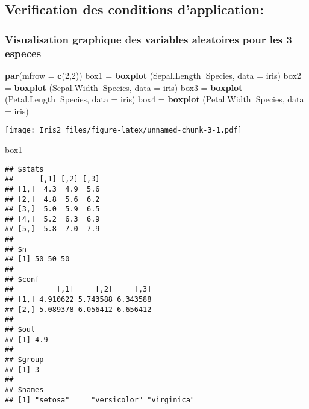 \documentclass[]{article}
\newenvironment{Shaded}{\begin{snugshade}}{\end{snugshade}}
\newcommand{\KeywordTok}[1]{\textcolor[rgb]{0.13,0.29,0.53}{\textbf{#1}}}
\newcommand{\DataTypeTok}[1]{\textcolor[rgb]{0.13,0.29,0.53}{#1}}
\newcommand{\DecValTok}[1]{\textcolor[rgb]{0.00,0.00,0.81}{#1}}
\newcommand{\StringTok}[1]{\textcolor[rgb]{0.31,0.60,0.02}{#1}}
\newcommand{\OperatorTok}[1]{\textcolor[rgb]{0.81,0.36,0.00}{\textbf{#1}}}
\newcommand{\NormalTok}[1]{#1}
\begin{document}
\subsection{Verification des conditions
d'application:}\label{verification-des-conditions-dapplication}

\subsubsection{Visualisation graphique des variables aleatoires pour les
3
especes}\label{visualisation-graphique-des-variables-aleatoires-pour-les-3-especes}

\begin{Shaded}
\begin{Highlighting}[]
\KeywordTok{par}\NormalTok{(}\DataTypeTok{mfrow =} \KeywordTok{c}\NormalTok{(}\DecValTok{2}\NormalTok{,}\DecValTok{2}\NormalTok{))}
\NormalTok{box1 =}\StringTok{ }\KeywordTok{boxplot}\NormalTok{ (Sepal.Length}\OperatorTok{~}\NormalTok{Species, }\DataTypeTok{data =}\NormalTok{ iris)}
\NormalTok{box2 =}\StringTok{ }\KeywordTok{boxplot}\NormalTok{ (Sepal.Width}\OperatorTok{~}\NormalTok{Species, }\DataTypeTok{data =}\NormalTok{ iris)}
\NormalTok{box3 =}\StringTok{ }\KeywordTok{boxplot}\NormalTok{ (Petal.Length}\OperatorTok{~}\NormalTok{Species, }\DataTypeTok{data =}\NormalTok{ iris)}
\NormalTok{box4 =}\StringTok{ }\KeywordTok{boxplot}\NormalTok{ (Petal.Width}\OperatorTok{~}\NormalTok{Species, }\DataTypeTok{data =}\NormalTok{ iris)}
\end{Highlighting}
\end{Shaded}

\texttt{[image: Iris2\_files/figure-latex/unnamed-chunk-3-1.pdf]}

\begin{Shaded}
\begin{Highlighting}[]
\NormalTok{box1}
\end{Highlighting}
\end{Shaded}

\begin{verbatim}
## $stats
##      [,1] [,2] [,3]
## [1,]  4.3  4.9  5.6
## [2,]  4.8  5.6  6.2
## [3,]  5.0  5.9  6.5
## [4,]  5.2  6.3  6.9
## [5,]  5.8  7.0  7.9
## 
## $n
## [1] 50 50 50
## 
## $conf
##          [,1]     [,2]     [,3]
## [1,] 4.910622 5.743588 6.343588
## [2,] 5.089378 6.056412 6.656412
## 
## $out
## [1] 4.9
## 
## $group
## [1] 3
## 
## $names
## [1] "setosa"     "versicolor" "virginica"
\end{verbatim}
\end{document}
